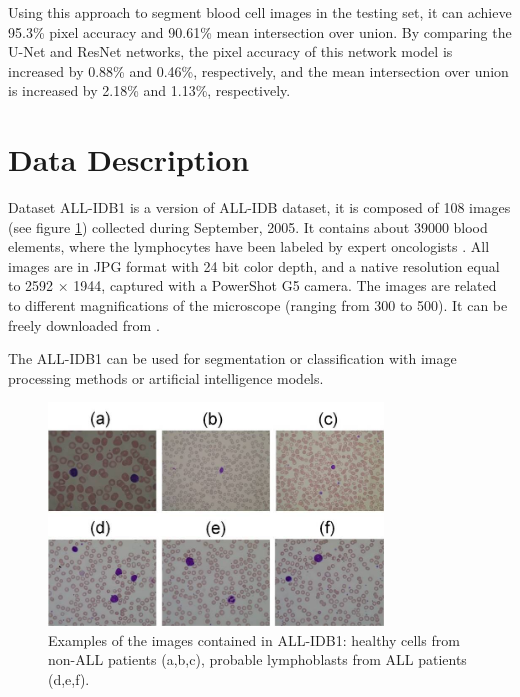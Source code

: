 \documentclass[conference]{IEEEtran}
\begin{document}
Using this approach to segment blood cell images in the testing set, it can achieve 95.3\% pixel accuracy and 90.61\% mean intersection over union. By comparing the U-Net and ResNet networks, the pixel accuracy of this network model is increased by 0.88\% and 0.46\%, respectively, and the mean intersection over union is increased by 2.18\% and 1.13\%, respectively.

\section{Data Description}
Dataset ALL-IDB1 is a version of ALL-IDB dataset, it is composed of 108 images (see figure \ref{img1}) collected during September, 2005. It contains about 39000 blood elements, where the lymphocytes have been labeled by expert oncologists \cite{labati2011all}. All images are in JPG format with 24 bit color depth, and a native resolution equal to 2592 × 1944, captured with a PowerShot G5 camera. The images are related to different magnifications of the microscope (ranging from 300 to 500). It can be freely downloaded from \cite{ALL_IDB_L}.

The ALL-IDB1 can be used for segmentation or classification with image processing methods or artificial intelligence models.
\begin{figure}[h]
\centering
\includegraphics[width=3.5in]{images/ALLIDB1.jpg}
\caption{Examples of the images contained in ALL-IDB1: healthy cells from non-ALL patients (a,b,c), probable lymphoblasts from ALL patients (d,e,f). }
\label{img1}
\end{figure}
\end{document}
